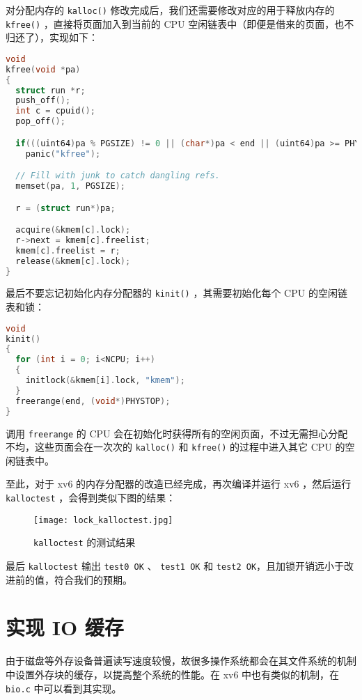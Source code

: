 对分配内存的 \lstinline{kalloc()} 修改完成后，我们还需要修改对应的用于释放内存的 \lstinline{kfree()} ，直接将页面加入到当前的 CPU 空闲链表中（即便是借来的页面，也不归还了），实现如下：
\begin{lstlisting}[language=C]
void
kfree(void *pa)
{
  struct run *r;
  push_off();
  int c = cpuid();
  pop_off();

  if(((uint64)pa % PGSIZE) != 0 || (char*)pa < end || (uint64)pa >= PHYSTOP)
    panic("kfree");

  // Fill with junk to catch dangling refs.
  memset(pa, 1, PGSIZE);

  r = (struct run*)pa;

  acquire(&kmem[c].lock);
  r->next = kmem[c].freelist;
  kmem[c].freelist = r;
  release(&kmem[c].lock);
}
\end{lstlisting}

最后不要忘记初始化内存分配器的 \lstinline{kinit()} ，其需要初始化每个 CPU 的空闲链表和锁：
\begin{lstlisting}[language=C]
void
kinit()
{
  for (int i = 0; i<NCPU; i++)
  {
    initlock(&kmem[i].lock, "kmem");
  }
  freerange(end, (void*)PHYSTOP);
}
\end{lstlisting}

调用 \lstinline{freerange} 的 CPU 会在初始化时获得所有的空闲页面，不过无需担心分配不均，这些页面会在一次次的 \lstinline{kalloc()} 和 \lstinline{kfree()} 的过程中进入其它 CPU 的空闲链表中。

至此，对于 xv6 的内存分配器的改造已经完成，再次编译并运行 xv6 ，然后运行 \lstinline{kalloctest} ，会得到类似下图的结果：
\begin{figure}[H]
  \centering
  \texttt{[image: lock\_kalloctest.jpg]}
  \caption{ \lstinline{kalloctest} 的测试结果}
\end{figure}
最后 \lstinline{kalloctest} 输出 \lstinline{test0 OK} 、 \lstinline{test1 OK} 和 \lstinline{test2 OK}，且加锁开销远小于改进前的值，符合我们的预期。

\section{实现 IO 缓存}

由于磁盘等外存设备普遍读写速度较慢，故很多操作系统都会在其文件系统的机制中设置外存块的缓存，以提高整个系统的性能。在 xv6 中也有类似的机制，在 \lstinline{bio.c} 中可以看到其实现。

